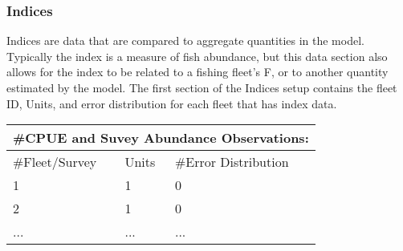 \subsubsection{Indices}
Indices are data that are compared to aggregate quantities in the model.  Typically the index is a measure of fish abundance, but this data section also allows for the index to be related to a fishing fleet's F, or to another quantity estimated by the model.  The first section of the Indices setup contains the fleet ID, Units, and error distribution for each fleet that has index data.

\begin{center}
	\begin{tabular}{p{3cm} p{2cm} p{3cm} p{3cm} p{3cm}}
		\multicolumn{5}{l}{\#CPUE and Suvey Abundance Observations:}\\
		\hline
		\#Fleet/Survey & Units & \multicolumn{3}{l}{\#Error Distribution}\\
		\hline
		1 & 1 & \multicolumn{3}{l}{0}\\
		2 & 1 & \multicolumn{3}{l}{0}\\
		... & ... & \multicolumn{3}{l}{...}\\
		\hline
	\end{tabular}		
\end{center}
